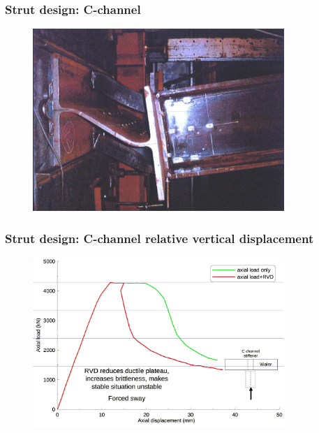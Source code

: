 \documentclass[handout]{beamer}
\begin{document}
\begin{frame}
\frametitle{Strut design: C-channel}
\begin{figure}[ht]
	\centering
	\includegraphics[width=0.85\textwidth]{figs/c-channel-stiffened.png}
\end{figure}
\end{frame}

\begin{frame}
\frametitle{Strut design: C-channel relative vertical displacement}
\begin{figure}[ht]
	\centering
	\includegraphics[width=0.85\textwidth]{figs/c-channel-effect-relative-vertical-disp.png}
\end{figure}
\end{frame}
\end{document}
